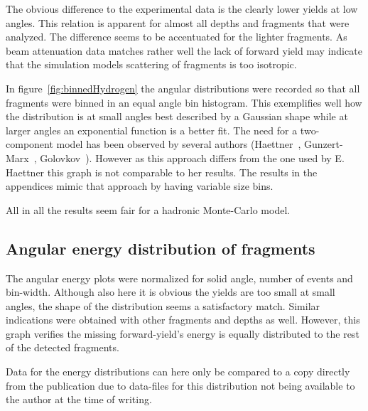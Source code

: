 The obvious difference to the experimental data is the clearly lower yields at low angles. This relation is apparent for almost all depths and fragments that were analyzed. The difference seems to be accentuated for the lighter fragments. As beam attenuation data matches rather well the lack of forward yield may indicate that the simulation models scattering of fragments is too isotropic.

In figure~\ref{fig:binnedHydrogen} the angular distributions were recorded so that all fragments were binned in an equal angle bin histogram. This exemplifies well how the distribution is at small angles best described by a Gaussian shape while at larger angles an exponential function is a better fit. The need for a two-component model has been observed by several authors (Haettner~\cite{ehaettner}, Gunzert-Marx~\cite{gunzert-marx}, Golovkov~\cite{golovkov}). However as this approach differs from the one used by E. Haettner this graph is not comparable to her results. The results in the appendices mimic that approach by having variable size bins.

All in all the results seem fair for a hadronic Monte-Carlo model.

\subsection{Angular energy distribution of fragments}

The angular energy plots were normalized for solid angle, number of events and bin-width. Although also here it is obvious the yields are too small at small angles, the shape of the distribution seems a satisfactory match. Similar indications were obtained with other fragments and depths as well. However, this graph verifies the missing forward-yield's energy is equally distributed to the rest of the detected fragments.

Data for the energy distributions can here only be compared to a copy directly from the publication due to data-files for this distribution not being available to the author at the time of writing.

